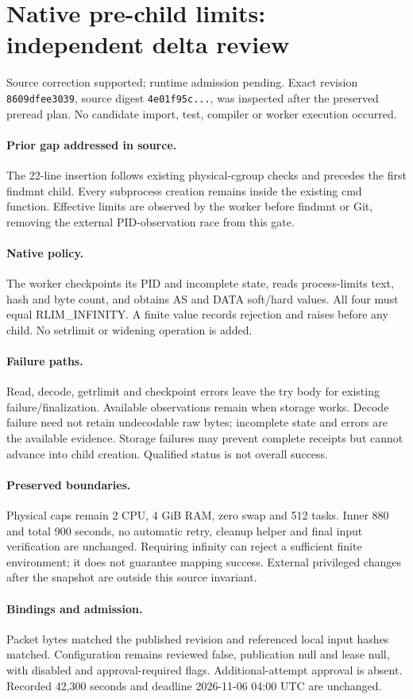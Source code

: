 \documentclass[10pt]{article}
\begin{document}
\section*{Native pre-child limits: independent delta review}
Source correction supported; runtime admission pending. Exact revision \texttt{8609dfee3039}, source digest \texttt{4e01f95c...}, was inspected after the preserved preread plan. No candidate import, test, compiler or worker execution occurred.
\paragraph{Prior gap addressed in source.} The 22-line insertion follows existing physical-cgroup checks and precedes the first findmnt child. Every subprocess creation remains inside the existing cmd function. Effective limits are observed by the worker before findmnt or Git, removing the external PID-observation race from this gate.
\paragraph{Native policy.} The worker checkpoints its PID and incomplete state, reads process-limits text, hash and byte count, and obtains AS and DATA soft/hard values. All four must equal RLIM\_INFINITY. A finite value records rejection and raises before any child. No setrlimit or widening operation is added.
\paragraph{Failure paths.} Read, decode, getrlimit and checkpoint errors leave the try body for existing failure/finalization. Available observations remain when storage works. Decode failure need not retain undecodable raw bytes; incomplete state and errors are the available evidence. Storage failures may prevent complete receipts but cannot advance into child creation. Qualified status is not overall success.
\paragraph{Preserved boundaries.} Physical caps remain 2 CPU, 4 GiB RAM, zero swap and 512 tasks. Inner 880 and total 900 seconds, no automatic retry, cleanup helper and final input verification are unchanged. Requiring infinity can reject a sufficient finite environment; it does not guarantee mapping success. External privileged changes after the snapshot are outside this source invariant.
\paragraph{Bindings and admission.} Packet bytes matched the published revision and referenced local input hashes matched. Configuration remains reviewed false, publication null and lease null, with disabled and approval-required flags. Additional-attempt approval is absent. Recorded 42,300 seconds and deadline 2026-11-06 04:00 UTC are unchanged.
\end{document}
